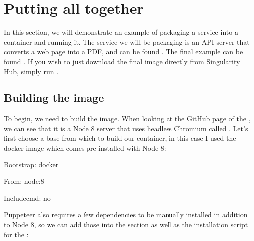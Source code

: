 \documentclass[letterpaper,10pt,english]{sphinxmanual}
\begin{document}
\section{Putting all together}
\label{\detokenize{running_services:putting-all-together}}
In this section, we will demonstrate an example of packaging a service
into a container and running it. The service we will be packaging is an
API server that converts a web page into a PDF, and can be found
. The final
example can be found .
If you wish to just download the final image directly from Singularity
Hub, simply run .


\subsection{Building the image}
\label{\detokenize{running_services:building-the-image}}
To begin, we need to build the image. When looking at the GitHub page of
the , we can see that it is a Node 8 server that uses headless Chromium
called . Let’s first choose a base from which to build our
container, in this case I used the docker image  which comes
pre-installed with Node 8:

%
\begin{sphinxVerbatim}[commandchars=\\\{\}]
Bootstrap: docker

From: node:8

Includecmd: no
\end{sphinxVerbatim}

\begin{DUlineblock}{0em}
\item[] Puppeteer also requires a few dependencies to be manually installed in
addition to Node 8, so we can add those into the  section as well as
the installation script for the :
\end{DUlineblock}
\end{document}
